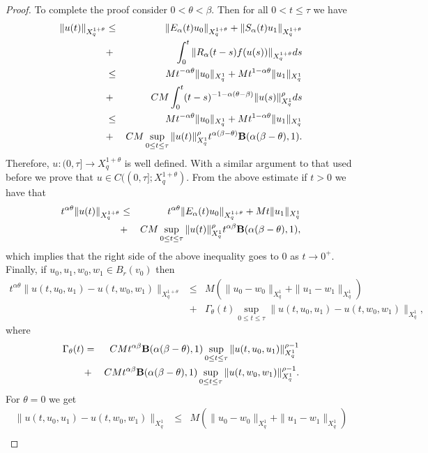 \documentclass[12pt,reqno]{amsart}
\begin{document}
\begin{proof}
	To complete the proof consider $0<\theta<\beta$. Then for all $0< t\leq \tau$ we have 
	\begin{eqnarray*}
		\|u(t)\|_{X^{1+\theta}_{q}} & \le & \|E_{\alpha}(t)u_0\|_{X^{1+\theta}_{q}}+\|S_{\alpha}(t)u_1\|_{X^{1+\theta}_{q}}\\
		&+& \int_{0}^{t}\|R_{\alpha}(t-s)f(u(s))\|_{X^{1+\theta}_{q}}ds\\
		&\le& Mt^{-\alpha\theta}\|u_0\|_{X^{1}_{q}}+Mt^{1-\alpha\theta}\|u_1\|_{X^{1}_{q}}\\
		&+& CM\int_{0}^{t}(t-s)^{-1-\alpha(\theta-\beta)}\|u(s)\|_{X^{1}_{q}}^{\rho}ds\\
		&\le& Mt^{-\alpha\theta}\|u_0\|_{X^{1}_{q}}+Mt^{1-\alpha\theta}\|u_1\|_{X^{1}_{q}}\\
		&+& CM\sup_{0\le t\le \tau}\|u(t)\|_{X^{1}_{q}}^{\rho}t^{\alpha(\beta-\theta)}{\bf B}(\alpha(\beta-\theta),1).
	\end{eqnarray*}
	Therefore, $u:(0,\tau]\to X^{1+\theta}_{q}$ is well defined. With a similar argument to that used before we prove that $u\in C((0,\tau];X^{1+\theta}_{q})$. From the above estimate if $t>0$ we have that
	\begin{eqnarray*}
		t^{\alpha\theta}\|u(t)\|_{X^{1+\theta}_{q}} & \le & t^{\alpha\theta}\|E_{\alpha}(t)u_0\|_{X^{1+\theta}_{q}}+Mt\|u_1\|_{X^{1}_{q}}\\
		&+& CM\sup_{0\le t\le \tau}\|u(t)\|_{X^{1}_{q}}^{\rho}t^{\alpha\beta}{\bf B}(\alpha(\beta-\theta),1),
	\end{eqnarray*}
which implies that the right side of the above inequality goes to $0$ as $t\to 0^+$. Finally, if $u_0, u_1,w_0,w_1\in B_{r}(v_0)$ then
	\begin{eqnarray*}
		t^{\alpha\theta} \|u(t,u_0,u_1)-u(t,w_0,w_1)\|_{X^{1+\theta}_{q}} &\le& M\left(\|u_0-w_0\|_{X^{1}_{q}}+\|u_1-w_1\|_{X^{1}_{q}}\right)\\
		&+& \Gamma_{\theta}(t)\sup_{0\le t\le \tau}\|u(t,u_0,u_1)-u(t,w_0,w_1)\|_{X^{1}_{q}},
	\end{eqnarray*}
	where
	\begin{eqnarray*}
		\Gamma_{\theta}(t)&=&CMt^{\alpha\beta}{\bf B}(\alpha(\beta-\theta),1)\sup_{0\le t\le \tau}\|u(t,u_0,u_1)\|_{X^{1}_{q}}^{\rho-1}\\
		&+&CMt^{\alpha\beta}{\bf B}(\alpha(\beta-\theta),1)\sup_{0\le t\le \tau}\|u(t,w_0,w_1)\|_{X^{1}_{q}}^{\rho-1}.
	\end{eqnarray*}
	For $\theta=0$ we get
	\begin{eqnarray*}
		\|u(t,u_0,u_1)-u(t,w_0,w_1)\|_{X^{1}_{q}} &\le& M\left(\|u_0-w_0\|_{X^{1}_{q}}+\|u_1-w_1\|_{X^{1}_{q}}\right)\\

\end{eqnarray*}
\end{proof}
\end{document}
